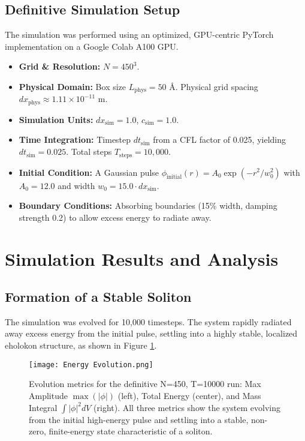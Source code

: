 \documentclass[11pt]{article}
\begin{document}
\subsection{Definitive Simulation Setup}
The simulation was performed using an optimized, GPU-centric PyTorch implementation on a Google Colab A100 GPU.
\begin{itemize}
    \item \textbf{Grid \& Resolution:} \(N=450^3\).
    \item \textbf{Physical Domain:} Box size \(L_{\text{phys}} = 50\) Å. Physical grid spacing \(dx_{\text{phys}} \approx 1.11 \times 10^{-11}\) m.
    \item \textbf{Simulation Units:} \(dx_{\text{sim}} = 1.0\), \(c_{\text{sim}} = 1.0\).
    \item \textbf{Time Integration:} Timestep \(dt_{\text{sim}}\) from a CFL factor of 0.025, yielding \(dt_{\text{sim}} = 0.025\). Total steps \(T_{\text{steps}} = 10,000\).
    \item \textbf{Initial Condition:} A Gaussian pulse \(\phi_{\text{initial}}(r) = A_0 \exp(-r^2/w_0^2)\) with \(A_0 = 12.0\) and width \(w_0 = 15.0 \cdot dx_{\text{sim}}\).
    \item \textbf{Boundary Conditions:} Absorbing boundaries (15\% width, damping strength 0.2) to allow excess energy to radiate away.
\end{itemize}

\section{Simulation Results and Analysis}

\subsection{Formation of a Stable Soliton}
The simulation was evolved for 10,000 timesteps. The system rapidly radiated away excess energy from the initial pulse, settling into a highly stable, localized eholokon structure, as shown in Figure \ref{fig:mass_gen_evolution}.

\begin{figure}[htbp]
    \centering
    \texttt{[image: Energy Evolution.png]}
    \caption{Evolution metrics for the definitive N=450, T=10000 run: Max Amplitude \(\max(|\phi|)\) (left), Total Energy (center), and Mass Integral \(\int|\phi|^2dV\) (right). All three metrics show the system evolving from the initial high-energy pulse and settling into a stable, non-zero, finite-energy state characteristic of a soliton.}
    \label{fig:mass_gen_evolution}
\end{figure}
\end{document}
